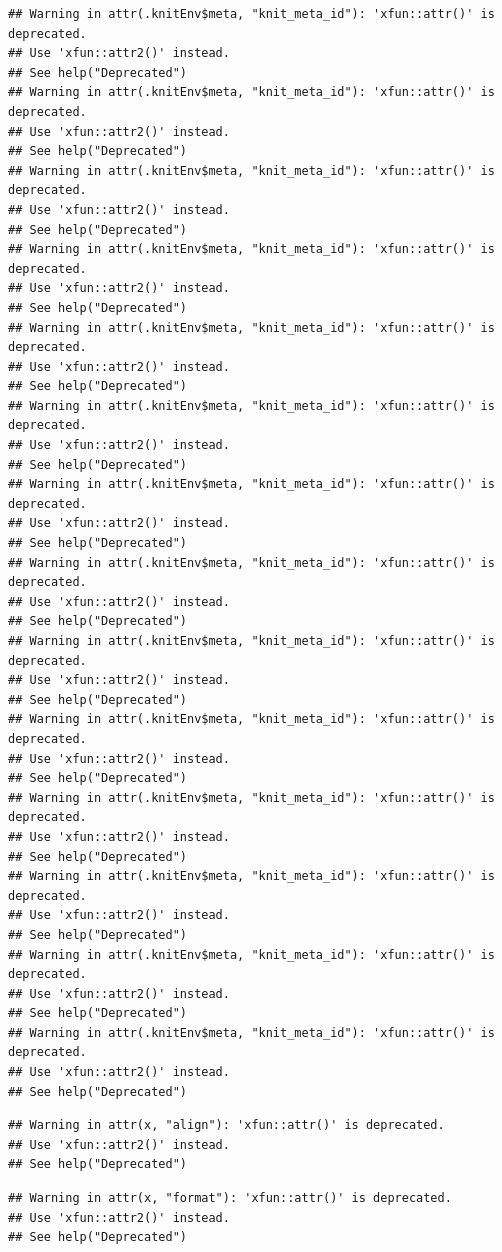 \documentclass[
]{article}
\begin{document}
\begin{verbatim}
## Warning in attr(.knitEnv$meta, "knit_meta_id"): 'xfun::attr()' is deprecated.
## Use 'xfun::attr2()' instead.
## See help("Deprecated")
## Warning in attr(.knitEnv$meta, "knit_meta_id"): 'xfun::attr()' is deprecated.
## Use 'xfun::attr2()' instead.
## See help("Deprecated")
## Warning in attr(.knitEnv$meta, "knit_meta_id"): 'xfun::attr()' is deprecated.
## Use 'xfun::attr2()' instead.
## See help("Deprecated")
## Warning in attr(.knitEnv$meta, "knit_meta_id"): 'xfun::attr()' is deprecated.
## Use 'xfun::attr2()' instead.
## See help("Deprecated")
## Warning in attr(.knitEnv$meta, "knit_meta_id"): 'xfun::attr()' is deprecated.
## Use 'xfun::attr2()' instead.
## See help("Deprecated")
## Warning in attr(.knitEnv$meta, "knit_meta_id"): 'xfun::attr()' is deprecated.
## Use 'xfun::attr2()' instead.
## See help("Deprecated")
## Warning in attr(.knitEnv$meta, "knit_meta_id"): 'xfun::attr()' is deprecated.
## Use 'xfun::attr2()' instead.
## See help("Deprecated")
## Warning in attr(.knitEnv$meta, "knit_meta_id"): 'xfun::attr()' is deprecated.
## Use 'xfun::attr2()' instead.
## See help("Deprecated")
## Warning in attr(.knitEnv$meta, "knit_meta_id"): 'xfun::attr()' is deprecated.
## Use 'xfun::attr2()' instead.
## See help("Deprecated")
## Warning in attr(.knitEnv$meta, "knit_meta_id"): 'xfun::attr()' is deprecated.
## Use 'xfun::attr2()' instead.
## See help("Deprecated")
## Warning in attr(.knitEnv$meta, "knit_meta_id"): 'xfun::attr()' is deprecated.
## Use 'xfun::attr2()' instead.
## See help("Deprecated")
## Warning in attr(.knitEnv$meta, "knit_meta_id"): 'xfun::attr()' is deprecated.
## Use 'xfun::attr2()' instead.
## See help("Deprecated")
## Warning in attr(.knitEnv$meta, "knit_meta_id"): 'xfun::attr()' is deprecated.
## Use 'xfun::attr2()' instead.
## See help("Deprecated")
## Warning in attr(.knitEnv$meta, "knit_meta_id"): 'xfun::attr()' is deprecated.
## Use 'xfun::attr2()' instead.
## See help("Deprecated")
\end{verbatim}

\begin{verbatim}
## Warning in attr(x, "align"): 'xfun::attr()' is deprecated.
## Use 'xfun::attr2()' instead.
## See help("Deprecated")
\end{verbatim}

\begin{verbatim}
## Warning in attr(x, "format"): 'xfun::attr()' is deprecated.
## Use 'xfun::attr2()' instead.
## See help("Deprecated")
\end{verbatim}
\end{document}
